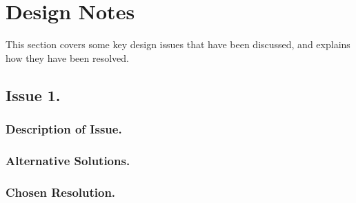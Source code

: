 \pagebreak
\section*{Design Notes}

This section covers some key design issues that have been discussed, and explains how they have been resolved.

\subsection*{Issue 1.}

\subsubsection*{Description of Issue.}

\subsubsection*{Alternative Solutions.}

\subsubsection*{Chosen Resolution.}

\pagebreak
